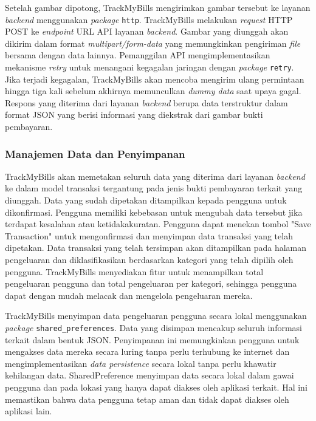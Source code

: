 Setelah gambar dipotong, TrackMyBills mengirimkan gambar tersebut ke layanan \emph{backend} menggunakan \emph{package} \texttt{http}. TrackMyBills melakukan \emph{request} HTTP POST ke \emph{endpoint} URL API layanan \emph{backend}. Gambar yang diunggah akan dikirim dalam format \emph{multipart/form-data} yang memungkinkan pengiriman \emph{file} bersama dengan data lainnya. Pemanggilan API mengimplementasikan mekanisme \emph{retry} untuk menangani kegagalan jaringan dengan \emph{package} \texttt{retry}. Jika terjadi kegagalan, TrackMyBills akan mencoba mengirim ulang permintaan hingga tiga kali sebelum akhirnya memunculkan \emph{dummy data} saat upaya gagal. Respons yang diterima dari layanan \emph{backend} berupa data terstruktur dalam format JSON yang berisi informasi yang diekstrak dari gambar bukti pembayaran.

\subsubsection{Manajemen Data dan Penyimpanan}
\label{subsubsec:manajemen-data-dan-penyimpanan}

TrackMyBills akan memetakan seluruh data yang diterima dari layanan \emph{backend} ke dalam model transaksi tergantung pada jenis bukti pembayaran terkait yang diunggah. Data yang sudah dipetakan ditampilkan kepada pengguna untuk dikonfirmasi. Pengguna memiliki kebebasan untuk mengubah data tersebut jika terdapat kesalahan atau ketidakakuratan. Pengguna dapat menekan tombol "Save Transaction" untuk mengonfirmasi dan menyimpan data transaksi yang telah dipetakan. Data transaksi yang telah tersimpan akan ditampilkan pada halaman pengeluaran dan diklasifikasikan berdasarkan kategori yang telah dipilih oleh pengguna. TrackMyBills menyediakan fitur untuk menampilkan total pengeluaran pengguna dan total pengeluaran per kategori, sehingga pengguna dapat dengan mudah melacak dan mengelola pengeluaran mereka.

TrackMyBills menyimpan data pengeluaran pengguna secara lokal menggunakan \emph{package} \texttt{shared\_preferences}. Data yang disimpan mencakup seluruh informasi terkait dalam bentuk JSON. Penyimpanan ini memungkinkan pengguna untuk mengakses data mereka secara luring tanpa perlu terhubung ke internet dan mengimplementasikan \emph{data persistence} secara lokal tanpa perlu khawatir kehilangan data. SharedPreference menyimpan data secara lokal dalam gawai pengguna dan pada lokasi yang hanya dapat diakses oleh aplikasi terkait. Hal ini memastikan bahwa data pengguna tetap aman dan tidak dapat diakses oleh aplikasi lain.

